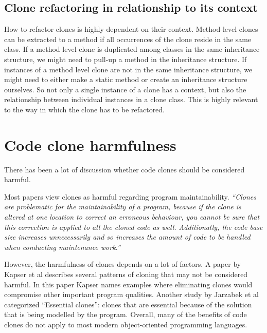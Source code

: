 \subsection{Clone refactoring in relationship to its context}
How to refactor clones is highly dependent on their context. Method-level clones can be extracted to a method \cite{kodhai2013method} if all occurrences of the clone reside in the same class. If a method level clone is duplicated among classes in the same inheritance structure, we might need to pull-up a method in the inheritance structure. If instances of a method level clone are not in the same inheritance structure, we might need to either make a static method or create an inheritance structure ourselves. So not only a single instance of a clone has a context, but also the relationship between individual instances in a clone class. This is highly relevant to the way in which the clone has to be refactored.

\section{Code clone harmfulness}
There has been a lot of discussion whether code clones should be considered harmful.

Most papers view clones as harmful regarding program maintainability. \textit{``Clones are problematic for the maintainability of a program, because if the clone is altered at one location to correct an erroneous behaviour, you cannot be sure that this correction is applied to all the cloned code as well. Additionally, the code base size increases unnecessarily and so increases the amount of code to be handled when conducting maintenance work.''} \cite{ostberg2014automatically}

However, the harmfulness of clones depends on a lot of factors. A paper by Kapser et al \cite{kapser2006cloning} describes several patterns of cloning that may not be considered harmful. In this paper Kapser names examples where eliminating clones would compromise other important program qualities. Another study by Jarzabek et al \cite{jarzabek2010clones} categorized ``Essential clones'': clones that are essential because of the solution that is being modelled by the program. Overall, many of the benefits of code clones do not apply to most modern object-oriented programming languages.

